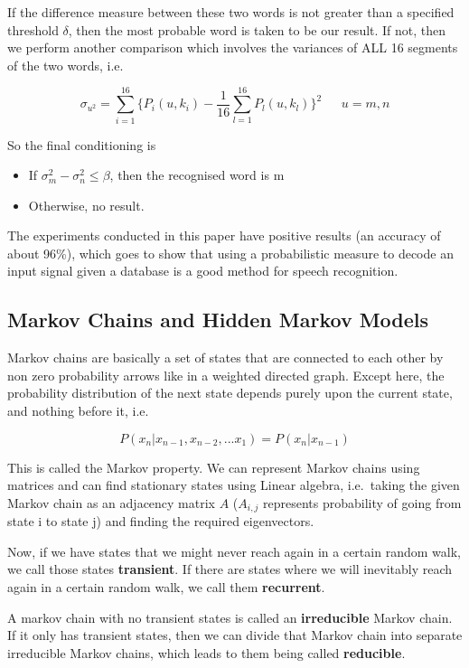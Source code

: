 If the difference measure between these two words is not greater than a
specified threshold \(\delta\), then the most probable word is taken to
be our result. If not, then we perform another comparison which involves
the variances of ALL 16 segments of the two words, i.e.

\[\sigma_{u^2} = \displaystyle\sum_{i = 1}^{16}\{P_i(u, k_i) - \frac{1}{16}\sum_{l = 1}^{16} P_l(u, k_l)\}^2 \ \ \ \ \ \ \  u = m, n\]

So the final conditioning is

\begin{itemize}
\item
  If \(\sigma_m^2 - \sigma_n^2 \leq \beta\), then the recognised word is
  m
\item
  Otherwise, no result.
\end{itemize}

The experiments conducted in this paper have positive results (an
accuracy of about 96\%), which goes to show that using a probabilistic
measure to decode an input signal given a database is a good method for
speech recognition.

\hypertarget{markov-chains-and-hidden-markov-models}{%
\subsection{Markov Chains and Hidden Markov
Models}\label{markov-chains-and-hidden-markov-models}}

Markov chains are basically a set of states that are connected to each
other by non zero probability arrows like in a weighted directed graph.
Except here, the probability distribution of the next state depends
purely upon the current state, and nothing before it, i.e.

\[P(x_n|x_{n-1}, x_{n-2}, ... x_1) = P(x_n|x_{n-1})\]

This is called the Markov property. We can represent Markov chains using
matrices and can find stationary states using Linear algebra,
i.e.~taking the given Markov chain as an adjacency matrix \(A\)
(\(A_{i, j}\) represents probability of going from state i to state j)
and finding the required eigenvectors.

Now, if we have states that we might never reach again in a certain
random walk, we call those states \textbf{transient}. If there are
states where we will inevitably reach again in a certain random walk, we
call them \textbf{recurrent}.

A markov chain with no transient states is called an
\textbf{irreducible} Markov chain. If it only has transient states, then
we can divide that Markov chain into separate irreducible Markov chains,
which leads to them being called \textbf{reducible}.

